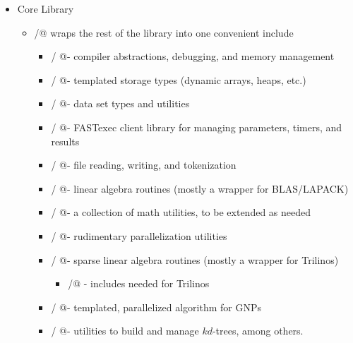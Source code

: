 \documentclass[letter]{report}
\begin{document}
\begin{itemize}

\item Core Library
  \begin{itemize}
  \item \verb@fastlib/@ wraps the rest of the library into one convenient include
    \begin{itemize}
    \item \verb@base/   @- compiler abstractions, debugging, and memory management
    \item \verb@col/    @- templated storage types (dynamic arrays, heaps, etc.)
    \item \verb@data/   @- data set types and utilities
    \item \verb@fx/     @- FASTexec client library for managing parameters, timers, and results
    \item \verb@file/   @- file reading, writing, and tokenization
    \item \verb@la/     @- linear algebra routines (mostly a wrapper for BLAS/LAPACK)
    \item \verb@math/   @- a collection of math utilities, to be extended as needed
    \item \verb@par/    @- rudimentary parallelization utilities
    \item \verb@sparse/ @- sparse linear algebra routines (mostly a wrapper for Trilinos)
      \begin{itemize}
      \item \verb@trilinos/@ - includes needed for Trilinos
      \end{itemize}
    \item \verb@thor/   @- templated, parallelized algorithm for GNPs
    \item \verb@tree/   @- utilities to build and manage $kd$-trees, among others.
    \end{itemize}
  \end{itemize}


\end{itemize}
\end{document}
